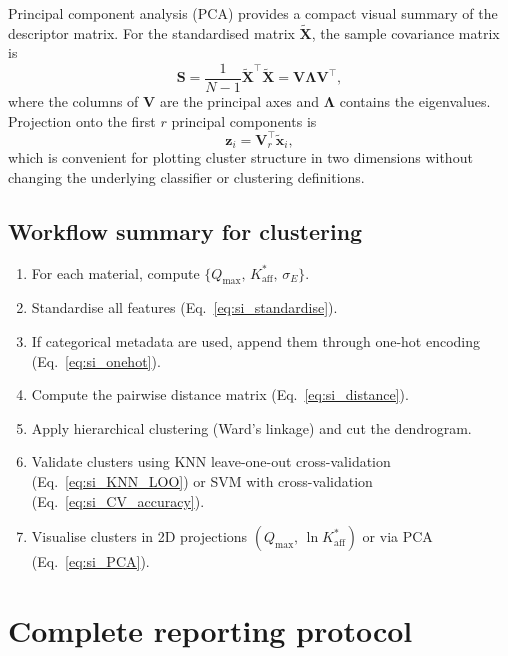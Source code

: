 \documentclass[journal=jacsat,manuscript=article]{achemso}
\begin{document}
Principal component analysis (PCA) provides a compact visual summary of
the descriptor matrix. For the standardised matrix
$\tilde{\mathbf{X}}$, the sample covariance matrix is
\begin{equation}
	\mathbf{S}
	=
	\frac{1}{N-1}\tilde{\mathbf{X}}^\top \tilde{\mathbf{X}}
	=
	\mathbf{V}\boldsymbol{\Lambda}\mathbf{V}^\top,
	\label{eq:si_PCA_cov}
\end{equation}
where the columns of $\mathbf{V}$ are the principal axes and
$\boldsymbol{\Lambda}$ contains the eigenvalues. Projection onto the
first $r$ principal components is
\begin{equation}
	\mathbf{z}_i = \mathbf{V}_r^\top \tilde{\mathbf{x}}_i,
	\label{eq:si_PCA}
\end{equation}
which is convenient for plotting cluster structure in two dimensions
without changing the underlying classifier or clustering definitions.

\subsection{Workflow summary for clustering}
\label{sec:si_clustering_workflow}

\begin{enumerate}
	\item For each material, compute
	$\{Q_{\max},\, K_{\mathrm{aff}}^{\ast},\, \sigma_E\}$.
	\item Standardise all features (Eq.~\ref{eq:si_standardise}).
	\item If categorical metadata are used, append them through one-hot
	encoding (Eq.~\ref{eq:si_onehot}).
	\item Compute the pairwise distance matrix
	(Eq.~\ref{eq:si_distance}).
	\item Apply hierarchical clustering (Ward's linkage) and cut
	the dendrogram.
	\item Validate clusters using KNN leave-one-out cross-validation
	(Eq.~\ref{eq:si_KNN_LOO}) or SVM with cross-validation
	(Eq.~\ref{eq:si_CV_accuracy}).
	\item Visualise clusters in 2D projections
	$(Q_{\max},\, \ln K_{\mathrm{aff}}^{\ast})$ or via PCA
	(Eq.~\ref{eq:si_PCA}).
\end{enumerate}


\section{Complete reporting protocol}
\label{sec:si_protocol}
\end{document}
